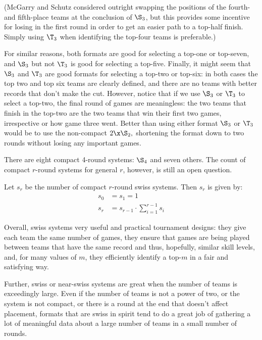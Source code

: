 {    (McGarry and Schutz \cite{four_five_swap} considered outright swapping the positions of the fourth- and fifth-place teams at the conclusion of $\S_3$, but this provides some incentive for losing in the first round in order to get an easier path to a top-half finish. Simply using $\T_3$ when identifying the top-four teams is preferable.)

    For similar reasons, both formats are good for selecting a top-one or top-seven, and $\S_3$ but not $\T_3$ is good for selecting a top-five. Finally, it might seem that $\S_3$ and $\T_3$ are good formats for selecting a top-two or top-six: in both cases the top two and top six teams are clearly defined, and there are no teams with better records that don't make the cut. However, notice that if we use $\S_3$ or $\T_3$ to select a top-two, the final round of games are meaningless: the two teams that finish in the top-two are the two teams that win their first two games, irrespective or how game three went. Better than using either format $\S_3$ or $\T_3$ would be to use the non-compact $2\x\S_2,$ shortening the format down to two rounds without losing any important games.

    There are eight compact 4-round systems: $\S_4$ and seven others. The count of compact $r$-round systems for general $r$, however, is still an open question.

    \begin{conj}{}{}
        Let $s_r$ be the number of compact $r$-round swiss systems. Then $s_r$ is given by:
        \begin{align*}
            s_0 &= s_ 1 = 1\\
            s_r &= s_{r-1} \cdot \sum_{i=1}^{r-1}s_i
        \end{align*}
    \end{conj}

    Overall, swiss systems very useful and practical tournament designs: they give each team the same number of games, they ensure that games are being played between teams that have the same record and thus, hopefully, similar skill levels, and, for many values of $m$, they efficiently identify a top-$m$ in a fair and satisfying way.

    Further, swiss or near-swiss systems are great when the number of teams is exceedingly large. Even if the number of teams is not a power of two, or the system is not compact, or there is a round at the end that doesn't affect placement, formats that are swiss in spirit tend to do a great job of gathering a lot of meaningful data about a large number of teams in a small number of rounds.
}